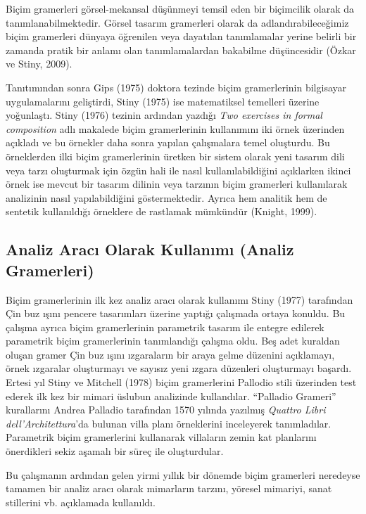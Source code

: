 \documentclass[12pt,turkish,a4paperpaper,]{report}
\begin{document}
Biçim gramerleri görsel-mekansal düşünmeyi temsil eden bir biçimcilik
olarak da tanımlanabilmektedir. Görsel tasarım gramerleri olarak da
adlandırabileceğimiz biçim gramerleri dünyaya öğrenilen veya dayatılan
tanımlamalar yerine belirli bir zamanda pratik bir anlamı olan
tanımlamalardan bakabilme düşüncesidir (Özkar ve Stiny, 2009).

Tanıtımından sonra Gips (1975) doktora tezinde biçim gramerlerinin
bilgisayar uygulamalarını geliştirdi, Stiny (1975) ise matematiksel
temelleri üzerine yoğunlaştı. Stiny (1976) tezinin ardından yazdığı
\emph{Two exercises in formal composition} adlı makalede biçim
gramerlerinin kullanımını iki örnek üzerinden açıkladı ve bu örnekler
daha sonra yapılan çalışmalara temel oluşturdu. Bu örneklerden ilki
biçim gramerlerinin üretken bir sistem olarak yeni tasarım dili veya
tarzı oluşturmak için özgün hali ile nasıl kullanılabildiğini açıklarken
ikinci örnek ise mevcut bir tasarım dilinin veya tarzının biçim
gramerleri kullanılarak analizinin nasıl yapılabildiğini göstermektedir.
Ayrıca hem analitik hem de sentetik kullanıldığı örneklere de rastlamak
mümkündür (Knight, 1999).

\hypertarget{analiz-aracux131-olarak-kullanux131mux131-analiz-gramerleri}{%
\subsection{Analiz Aracı Olarak Kullanımı (Analiz
Gramerleri)}\label{analiz-aracux131-olarak-kullanux131mux131-analiz-gramerleri}}

Biçim gramerlerinin ilk kez analiz aracı olarak kullanımı Stiny (1977)
tarafından Çin buz ışını pencere tasarımları üzerine yaptığı çalışmada
ortaya konuldu. Bu çalışma ayrıca biçim gramerlerinin parametrik tasarım
ile entegre edilerek parametrik biçim gramerlerinin tanımlandığı çalışma
oldu. Beş adet kuraldan oluşan gramer Çin buz ışını ızgaraların bir
araya gelme düzenini açıklamayı, örnek ızgaralar oluşturmayı ve sayısız
yeni ızgara düzenleri oluşturmayı başardı. Ertesi yıl Stiny ve Mitchell
(1978) biçim gramerlerini Pallodio stili üzerinden test ederek ilk kez
bir mimari üslubun analizinde kullandılar. ``Palladio Grameri''
kurallarını Andrea Palladio tarafından 1570 yılında yazılmış
\emph{Quattro Libri dell'Architettura}'da bulunan villa planı
örneklerini inceleyerek tanımladılar. Parametrik biçim gramerlerini
kullanarak villaların zemin kat planlarını önerdikleri sekiz aşamalı bir
süreç ile oluşturdular.

Bu çalışmanın ardından gelen yirmi yıllık bir dönemde biçim gramerleri
neredeyse tamamen bir analiz aracı olarak mimarların tarzını, yöresel
mimariyi, sanat stillerini vb. açıklamada kullanıldı.
\end{document}
